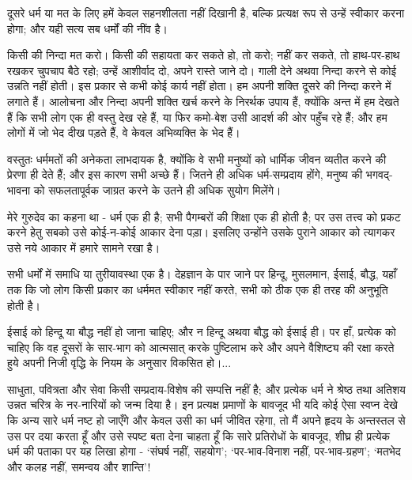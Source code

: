 दूसरे धर्म या मत के लिए हमें केवल सहनशीलता नहीं दिखानी है, बल्कि प्रत्यक्ष रूप से उन्हें स्वीकार करना होगा; और यही सत्य सब धर्मों की नींव है। 

किसी की निन्दा मत करो। किसी की सहायता कर सकते हो, तो करो; नहीं कर सकते, तो हाथ-पर-हाथ रखकर चुपचाप बैठे रहो; उन्हें आशीर्वाद दो, अपने रास्ते जाने दो। गाली देने अथवा निन्दा करने से कोई उन्नति नहीं होती। इस प्रकार से कभी कोई कार्य नहीं होता। हम अपनी शक्ति दूसरे की निन्दा करने में लगाते हैं। आलोचना और निन्दा अपनी शक्ति खर्च करने के निरर्थक उपाय हैं, क्योंकि अन्त में हम देखते हैं कि सभी लोग एक ही वस्तु देख रहे हैं, या फिर कमो-बेश उसी आदर्श की ओर पहुँच रहे हैं; और हम लोगों में जो भेद दीख पड़ते हैं, वे केवल अभिव्यक्ति के भेद हैं। 

वस्तुतः धर्ममतों की अनेकता लाभदायक है, क्योंकि वे सभी मनुष्यों को धार्मिक जीवन व्यतीत करने की प्रेरणा ही देते हैं; और इस कारण सभी अच्छे हैं। जितने ही अधिक धर्म-सम्प्रदाय होंगे, मनुष्य की भगवद्-भावना को सफलतापूर्वक जाग्रत करने के उतने ही अधिक सुयोग मिलेंगे। 

मेरे गुरुदेव का कहना था - धर्म एक ही है; सभी पैगम्बरों की शिक्षा एक ही होती है; पर उस तत्त्व को प्रकट करने हेतु सबको उसे कोई-न-कोई आकार देना पड़ा। इसलिए उन्होंने उसके पुराने आकार को त्यागकर उसे नये आकार में हमारे सामने रखा है। 

\newpage

सभी धर्मों में समाधि या तुरीयावस्था एक है। देहज्ञान के पार जाने पर हिन्दू, मुसलमान, ईसाई, बौद्ध, यहाँ तक कि जो लोग किसी प्रकार का धर्ममत स्वीकार नहीं करते, सभी को ठीक एक ही तरह की अनुभूति होती है। 

\vskip 2pt

ईसाई को हिन्दू या बौद्ध नहीं हो जाना चाहिए; और न हिन्दू अथवा बौद्ध को ईसाई ही। पर हाँ, प्रत्येक को चाहिए कि वह दूसरों के सार-भाग को आत्मसात् करके पुष्टिलाभ करे और अपने वैशिष्ट्य की रक्षा करते हुये अपनी निजी वृद्धि के नियम के अनुसार विकसित हो।... 

\vskip 2pt

साधुता, पवित्रता और सेवा किसी सम्प्रदाय-विशेष की सम्पत्ति नहीं है; और प्रत्येक धर्म ने श्रेष्ठ तथा अतिशय उन्नत चरित्र के नर-नारियों को जन्म दिया है। इन प्रत्यक्ष प्रमाणों के बावजूद भी यदि कोई ऐसा स्वप्न देखे कि अन्य सारे धर्म नष्ट हो जाएँगे और केवल उसी का धर्म जीवित रहेगा, तो मैं अपने हृदय के अन्तस्तल से उस पर दया करता हूँ और उसे स्पष्ट बता देना चाहता हूँ कि सारे प्रतिरोधों के बावजूद, शीघ्र ही प्रत्येक धर्म की पताका पर यह लिखा होगा - ‘संघर्ष नहीं, सहयोग’; ‘पर-भाव-विनाश नहीं, पर-भाव-ग्रहण’; ‘मतभेद और कलह नहीं, समन्वय और शान्ति’! 

